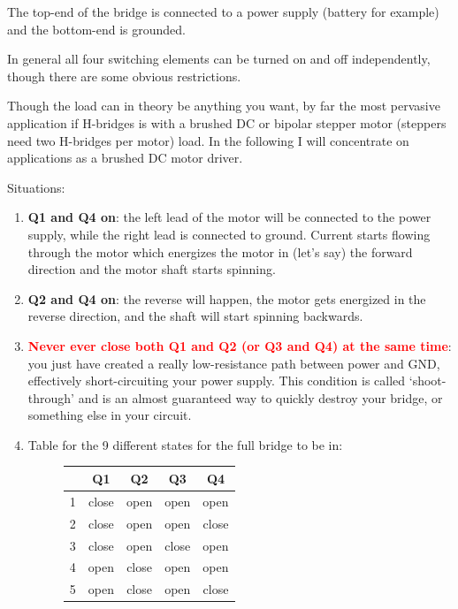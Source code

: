 \begin{enumerate}
    The top-end of the bridge is connected to a power supply (battery for example) and the bottom-end is grounded.

    In general all four switching elements can be turned on and off independently, though there are some obvious restrictions.

    Though the load can in theory be anything you want, by far the most pervasive application if H-bridges is with a brushed DC or bipolar stepper motor (steppers need two H-bridges per motor) load. In the following I will concentrate on applications as a brushed DC motor driver.

    Situations:
    \begin{enumerate}
        \item \textbf{Q1 and Q4 on}: the left lead of the motor will be connected to the power supply, while the right lead is connected to ground. Current starts flowing through the motor which energizes the motor in (let’s say) the forward direction and the motor shaft starts spinning.
        \item \textbf{Q2 and Q4 on}: the reverse will happen, the motor gets energized in the reverse direction, and the shaft will start spinning backwards.
        \item \textcolor{red}{\textbf{Never ever close both Q1 and Q2 (or Q3 and Q4) at the same time}}: you just have created a really low-resistance path between power and GND, effectively short-circuiting your power supply. This condition is called ‘shoot-through’ and is an almost guaranteed way to quickly destroy your bridge, or something else in your circuit.
        \item Table for the 9 different states for the full bridge to be in: 
        \begin{figure}[H]
            \centering
            \begin{tabular}[ H, 0.7\textwidth]{ |c|c|c|c|c|}
                \hline
                    & Q1 & Q2 & Q3 & Q4 \\
                \hline
                    1 & close & open & open & open \\
                \hline
                    2 & close & open & open & close \\
                \hline
                    3 & close & open & close & open \\
                \hline
                    4 & open & close & open & open \\
                \hline
                    5 & open & close & open & close \\

\end{tabular}
\end{figure}
\end{enumerate}
\end{enumerate}
